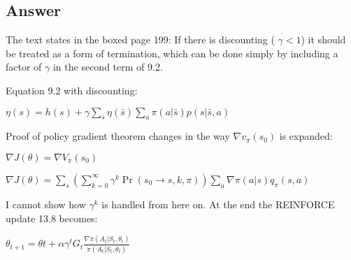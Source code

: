\documentclass[11pt]{article}
\begin{document}
    \subsection*{Answer}

    \noindent The text states in the boxed page 199: If there is discounting ( $\gamma < 1 $) it should be treated as a form of termination, which can be done simply by including a factor of $\gamma$ in the second term of 9.2.

    \noindent Equation 9.2 with discounting:

    \noindent $ \eta(s) = h(s) + \gamma \sum_{\bar{s}} \eta(\bar{s}) \sum_{a} \pi(a|\bar{s}) p(s| \bar{s},a)  $

    \hfill \break
    \noindent Proof of policy gradient theorem changes in the way $ \nabla v_{\pi}(s_0) $ is expanded:

    \noindent $ \nabla J(\theta) = \nabla V_{\pi}(s_{0})  $

    \noindent $ \nabla J(\theta) = \sum_{s} ( \sum_{k=0}^{\infty} \gamma^{k} \Pr(s_0 \rightarrow s, k, \pi )  ) \sum_{a} \nabla \pi(a|s) q_\pi (s,a) $

    \hfill \break
    \noindent I cannot show how $ \gamma^k $ is handled from here on.
    At the end the REINFORCE update 13.8 becomes:

    \noindent $ \theta_{t+1} = \theta{t} + \alpha \gamma^t G_{t} \frac{\nabla\pi(A_t | S_t , \theta_t)}{\pi(A_t | S_t , \theta_t)} $
\end{document}
